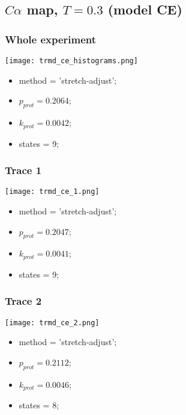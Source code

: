 \subsection{$C\alpha$ map, $T=0.3$ (model CE)}
\subsubsection{Whole experiment}
\begin{minipage}[c]{0.7\textwidth}
    \texttt{[image: trmd\_ce\_histograms.png]}
\end{minipage}
\hfill
\begin{minipage}[c]{0.45\textwidth}
    \begin{itemize}
        \item method = 'stretch-adjust';
        \item $p_{prot}=0.2064$;
        \item $k_{prot}=0.0042$;
        \item states = 9;
    \end{itemize}
\end{minipage}

\subsubsection{Trace 1}
\begin{minipage}[c]{0.7\textwidth}
	\texttt{[image: trmd\_ce\_1.png]}
\end{minipage}
\hfill
\begin{minipage}[c]{0.45\textwidth}
	\begin{itemize}
		\item method = 'stretch-adjust';
		\item $p_{prot}=0.2047$;
		\item $k_{prot}=0.0041$;
		\item states = 9;
	\end{itemize}
\end{minipage}

\subsubsection{Trace 2}
\begin{minipage}[c]{0.7\textwidth}
	\texttt{[image: trmd\_ce\_2.png]}
\end{minipage}
\hfill
\begin{minipage}[c]{0.45\textwidth}
	\begin{itemize}
		\item method = 'stretch-adjust';
		\item $p_{prot}=0.2112$;
		\item $k_{prot}=0.0046$;
		\item states = 8;
	\end{itemize}
\end{minipage}

